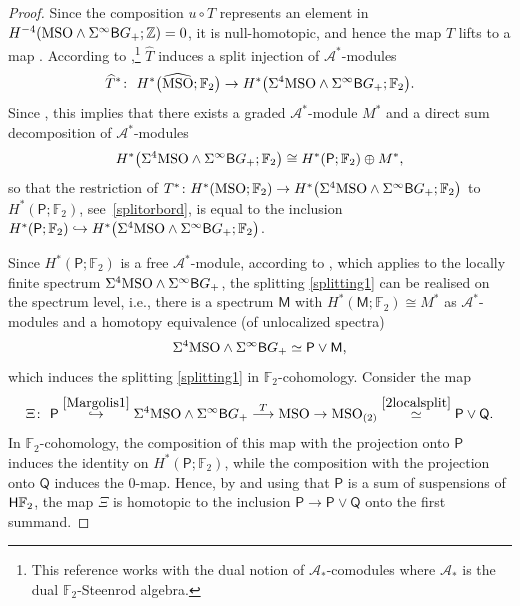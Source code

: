 \documentclass[10pt,a4paper]{amsart}
\numberwithin{equation}{section}
\newcommand{\F}{\mathbb{F}}
\newcommand{\Z}{\mathbb{Z}}
\newcommand{\MSO}{{\rm MSO}}
\newcommand{\sB}{{\sf B}}
\begin{document}
\begin{proof}
Since the composition $u \circ T$ represents an element in $H^{-4}( \MSO \wedge \Sigma^{\infty} \sB G_+; \Z) = 0$, it is null-homotopic, and hence the map $T$ lifts to a map \smash{$\widehat T \colon \Sigma^4 \MSO \wedge \Sigma^{\infty} \sB G_+ \to \widehat \MSO$}.
According to \cite[Theorem 2.2]{Fuehring_bordism},\footnote{This reference works with the dual notion of $\mathscr{A}_*$-comodules where $\mathscr{A}_*$ is the dual $\F_2$-Steenrod algebra.} $\widehat T$ induces a split injection of $\mathscr{A}^*$-modules
\[
 \widehat T^* \colon\ H^*\big( \widehat\MSO; \F_2\big) \to H^{*}\big( \Sigma^4 \MSO \wedge \Sigma^{\infty} \sB G_+; \F_2\big) .
\]
Since \smash{$\big( \widehat \MSO\big)_{(2)} \simeq \sf{P} \vee \sf{Q'}$}, this implies that there exists a graded $\mathscr{A}^*$-module $M^*$ and a direct sum decomposition of $\mathscr{A}^{*}$-modules
\begin{equation} \label{splitting1}
 H^{*}\big(\Sigma^4 \MSO \wedge \Sigma^{\infty} \sB G_+; \F_2\big) \cong H^*(\mathsf{P}; \F_2) \oplus M^*,
\end{equation}
so that the restriction of $T^* \colon H^{*} (\MSO; \F_2) \to H^*\big(\Sigma^4 \MSO \wedge \Sigma^{\infty} \sB G_+; \F_2\big)$ to $H^*(\mathsf{P}; \F_2)$, see~\eqref{splitorbord}, is equal to the inclusion $H^*(\mathsf{P}; \F_2) \hookrightarrow H^{*}\big(\Sigma^4 \MSO \wedge \Sigma^{\infty} \sB G_+; \F_2\big)$.

Since $H^*(\mathsf{P}; \F_2)$ is a free $\mathscr{A}^*$-module, according to \cite[Theorem 2\,(a)]{Mar74}, which applies to the locally finite spectrum $\Sigma^4 \MSO \wedge \Sigma^{\infty} \sB G_+$, the splitting \eqref{splitting1} can be realised on the spectrum level, i.e., there is a spectrum $\mathsf{M}$ with $H^*(\mathsf{M} ;\F_2) \cong M^*$ as $\mathscr{A}^*$-modules and a homotopy equivalence (of unlocalized spectra)
\begin{equation} \label{Margolis1}
\Sigma^4 \MSO \wedge \Sigma^{\infty} \sB G_+ \simeq \mathsf{P} \vee \mathsf{M},
 \end{equation}
which induces the splitting \eqref{splitting1} in $\F_2$-cohomology.
Consider the map
\[
 \Xi \colon\ \mathsf{P} \stackrel{\eqref{Margolis1}}{\hookrightarrow} \Sigma^4 \MSO \wedge \Sigma^{\infty} \sB G_+ \stackrel{T}{\longrightarrow} \MSO \to \MSO_{(2)} \stackrel{\eqref{2localsplit}}{\simeq} \mathsf{P} \vee \mathsf{Q} .
 \]
In $\F_2$-cohomology, the composition of this map with the projection onto $\mathsf{P}$ induces the identity on $H^*(\mathsf{P}; \F_2)$, while the composition with the projection onto $\mathsf{Q}$ induces the $0$-map.
Hence, by \cite[Theorem 3]{Mar74} and using that $\mathsf{P}$ is a sum of suspensions of ${\sf H}\F_2$, the map $\Xi$ is homotopic to the inclusion $\mathsf{P} \to \mathsf{P} \vee \mathsf{Q}$ onto the first summand.


\end{proof}
\end{document}
